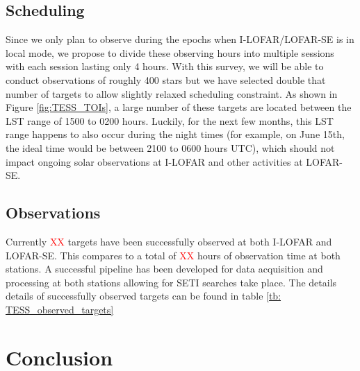 \documentclass{aastex63}
\begin{document}
\subsection{Scheduling}
Since we only plan to observe during the epochs when I-LOFAR/LOFAR-SE is in local mode, we propose to divide these observing hours into multiple sessions with each session lasting only 4 hours. With this survey, we will be able to conduct observations of roughly 400 stars but we have selected double that number of targets to allow slightly relaxed scheduling constraint. As shown in Figure \ref{fig:TESS_TOIs}, a large number of these targets are located between the LST range of 1500 to 0200 hours. Luckily, for the next few months, this LST range happens to also occur during the night times (for example, on June 15th, the ideal time would be between 2100 to 0600 hours UTC), which should not impact ongoing solar observations at I-LOFAR and other activities at LOFAR-SE. 

\subsection{Observations}
Currently \textcolor{red}{XX} targets have been successfully observed at both I-LOFAR and LOFAR-SE. This compares to a total of \textcolor{red}{XX} hours of observation time at both stations. A successful pipeline has been developed for data acquisition and processing at both stations allowing for SETI searches take place. The details details of successfully observed targets can be found in table \ref{tb: TESS_observed_targets} 

\section{Conclusion}



\end{document}
